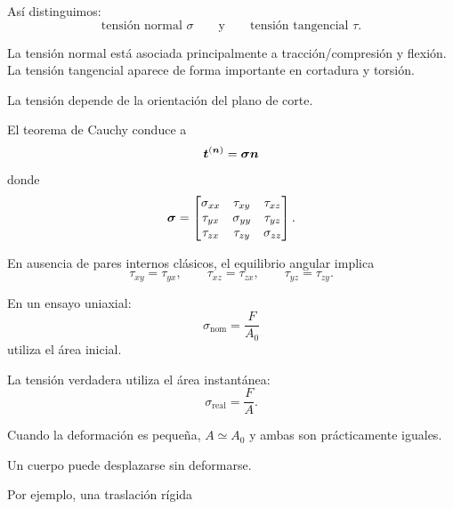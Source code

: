 Así distinguimos:
\[
\text{tensión normal }\sigma
\qquad\text{y}\qquad
\text{tensión tangencial }\tau.
\]

La tensión normal está asociada principalmente a tracción/compresión y flexión. La tensión tangencial aparece de forma importante en cortadura y torsión.

La tensión depende de la orientación del plano de corte.

El teorema de Cauchy conduce a
\[
\boldsymbol{t}^{(\boldsymbol{n})}=\boldsymbol{\sigma}\boldsymbol{n}
\]
donde
\[
\boldsymbol{\sigma}=
\begin{bmatrix}
\sigma_{xx}&\tau_{xy}&\tau_{xz}\\
\tau_{yx}&\sigma_{yy}&\tau_{yz}\\
\tau_{zx}&\tau_{zy}&\sigma_{zz}
\end{bmatrix}.
\]

En ausencia de pares internos clásicos, el equilibrio angular implica
\[
\tau_{xy}=\tau_{yx},\qquad
\tau_{xz}=\tau_{zx},\qquad
\tau_{yz}=\tau_{zy}.
\]

En un ensayo uniaxial:
\[
\sigma_{\mathrm{nom}}=\frac{F}{A_0}
\]
utiliza el área inicial.

La tensión verdadera utiliza el área instantánea:
\[
\sigma_{\mathrm{real}}=\frac{F}{A}.
\]

Cuando la deformación es pequeña, $A\simeq A_0$ y ambas son prácticamente iguales.


Un cuerpo puede desplazarse sin deformarse.

Por ejemplo, una traslación rígida
